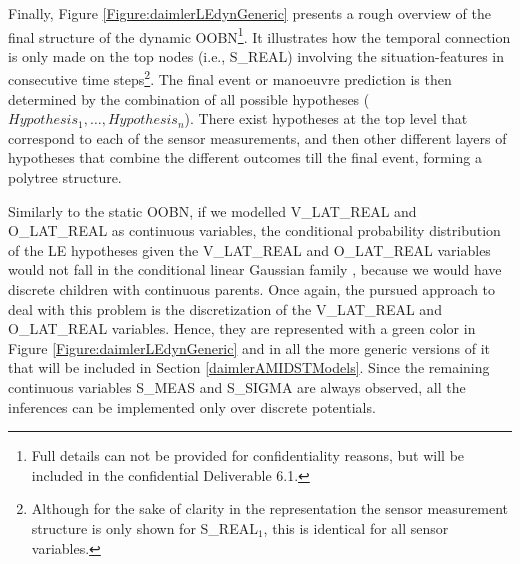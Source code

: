 Finally, Figure \ref{Figure:daimlerLEdynGeneric} presents a rough overview of the final structure of the dynamic OOBN\footnote{Full details can not be provided for confidentiality reasons, but will be included in the confidential Deliverable 6.1.}. It illustrates how the temporal connection is only made on the top nodes (i.e., S\_REAL) involving the situation-features in consecutive time steps\footnote{Although for the sake of clarity in the representation the sensor measurement structure is only shown for S\_REAL$_1$, this is identical for all sensor variables.}. The final event or manoeuvre prediction is then determined by the combination of all possible hypotheses ($Hypothesis_1, \ldots, Hypothesis_n$). There exist hypotheses at the top level that correspond to each of the sensor measurements, and then other different layers of hypotheses that combine the different outcomes till the final event, forming a polytree structure. %

Similarly to the static OOBN, if we modelled V\_LAT\_REAL and O\_LAT\_REAL as continuous variables, the conditional probability distribution of the LE hypotheses given the V\_LAT\_REAL and O\_LAT\_REAL variables would not fall in the conditional linear Gaussian family \cite{JensenNielsen2007}, because we would have discrete children with continuous parents. Once again, the pursued approach to deal with this problem is the discretization of the V\_LAT\_REAL and O\_LAT\_REAL variables. Hence, they are represented with a green color in Figure \ref{Figure:daimlerLEdynGeneric} and in all the more generic versions of it that will be included in Section \ref{daimlerAMIDSTModels}. Since the remaining continuous variables S\_MEAS and S\_SIGMA are always observed, all the inferences can be implemented only over discrete potentials.

